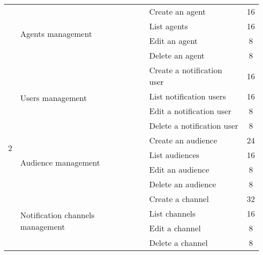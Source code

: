 \begin{longtable}{ | m{}  | m{} | m{} | c | }
    \cline{2-4}
                            & \multirow{4}{5em}{Agents management}                & Create an agent            & 16                          \\
    \cline{3-4}
                            &                                                     & List agents                & 16                          \\
    \cline{3-4}
                            &                                                     & Edit an agent              & 8                           \\
    \cline{3-4}
                            &                                                     & Delete an agent            & 8                           \\
    \cline{2-4}
                            & \multirow{4}{5em}{Users management}                 & Create a notification user & 16                          \\
    \cline{3-4}
                            &                                                     & List notification users    & 16                          \\
    \cline{3-4}
                            &                                                     & Edit a notification user   & 8                           \\
    \cline{3-4}
                            &                                                     & Delete a notification user & 8                           \\
    \hline
    \multirow[t]{2}{5em}{2} & \multirow{4}{5em}{Audience management}              & Create an audience         & 24                          \\
    \cline{3-4}
                            &                                                     & List audiences             & 16                          \\
    \cline{3-4}
                            &                                                     & Edit an audience           & 8                           \\
    \cline{3-4}
                            &                                                     & Delete an audience         & 8                           \\
    \cline{2-4}
                            & \multirow{4}{5em}{Notification channels management} & Create a channel           & 32                          \\
    \cline{3-4}
                            &                                                     & List channels              & 16                          \\
    \cline{3-4}
                            &                                                     & Edit a channel             & 8                           \\
    \cline{3-4}
                            &                                                     & Delete a channel           & 8                           \\
    \hline
\end{longtable}

